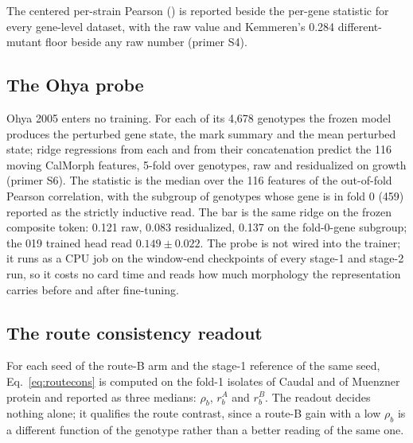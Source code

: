\endgroup

The centered per-strain Pearson () is reported beside the per-gene statistic for
every gene-level dataset, with the raw value and Kemmeren's 0.284 different-mutant floor beside
any raw number (primer S4).

\subsection{The Ohya probe}
\label{sec:ohya}

Ohya 2005 enters no training. For each of its 4{,}678 genotypes the frozen model produces the
perturbed gene state, the mark summary and the mean perturbed state; ridge regressions from
each and from their concatenation predict the 116 moving CalMorph features, 5-fold over
genotypes, raw and residualized on growth (primer S6). The statistic is the median over the
116 features of the out-of-fold Pearson correlation, with the subgroup of genotypes whose gene
is in fold 0 (459) reported as the strictly inductive read. The bar is the same ridge on the
frozen composite token: 0.121 raw, 0.083 residualized, 0.137 on the fold-0-gene subgroup; the
019 trained head read $0.149 \pm 0.022$. The probe is not wired into the trainer; it runs as a
CPU job on the window-end checkpoints of every stage-1 and stage-2 run, so it costs no card
time and reads how much morphology the representation carries before and after fine-tuning.

\subsection{The route consistency readout}
\label{sec:routeread}

For each seed of the route-B arm and the stage-1 reference of the same seed,
Eq.~\ref{eq:routecons} is computed on the fold-1 isolates of Caudal and of Muenzner protein and
reported as three medians: $\rho_b$, $r^{A}_b$ and $r^{B}_b$. The readout decides nothing alone;
it qualifies the route contrast, since a route-B gain with a low $\rho_b$ is a different function
of the genotype rather than a better reading of the same one.
